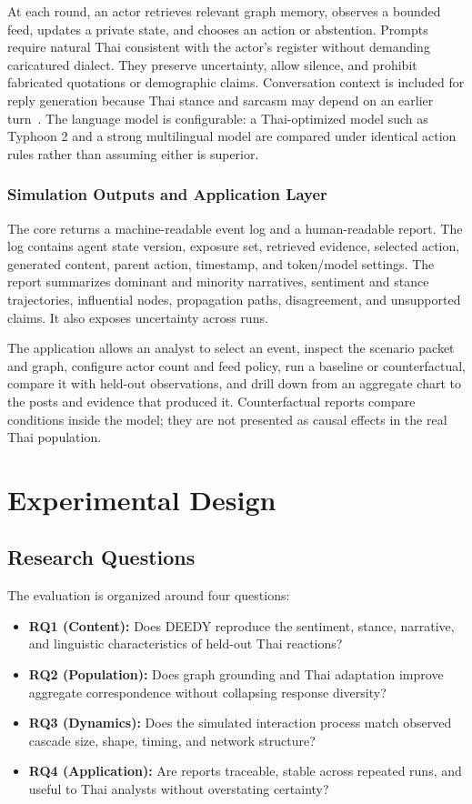 \documentclass[conference]{IEEEtran}
\begin{document}
At each round, an actor retrieves relevant graph memory, observes a bounded
feed, updates a private state, and chooses an action or abstention. Prompts
require natural Thai consistent with the actor's register without demanding
caricatured dialect. They preserve uncertainty, allow silence, and prohibit
fabricated quotations or demographic claims. Conversation context is included
for reply generation because Thai stance and sarcasm may depend on an earlier
turn~\cite{hazarika2018cascade}. The language model is configurable: a
Thai-optimized model such as Typhoon 2 and a strong multilingual model are
compared under identical action rules rather than assuming either is superior.

\subsubsection{Simulation Outputs and Application Layer}

The core returns a machine-readable event log and a human-readable report. The
log contains agent state version, exposure set, retrieved evidence, selected
action, generated content, parent action, timestamp, and token/model settings.
The report summarizes dominant and minority narratives, sentiment and stance
trajectories, influential nodes, propagation paths, disagreement, and
unsupported claims. It also exposes uncertainty across runs.

The application allows an analyst to select an event, inspect the scenario
packet and graph, configure actor count and feed policy, run a baseline or
counterfactual, compare it with held-out observations, and drill down from an
aggregate chart to the posts and evidence that produced it. Counterfactual
reports compare conditions inside the model; they are not presented as causal
effects in the real Thai population.

\section{Experimental Design}

\subsection{Research Questions}

The evaluation is organized around four questions:
\begin{itemize}
    \item \textbf{RQ1 (Content):} Does DEEDY reproduce the sentiment, stance,
    narrative, and linguistic characteristics of held-out Thai reactions?
    \item \textbf{RQ2 (Population):} Does graph grounding and Thai adaptation
    improve aggregate correspondence without collapsing response diversity?
    \item \textbf{RQ3 (Dynamics):} Does the simulated interaction process match
    observed cascade size, shape, timing, and network structure?
    \item \textbf{RQ4 (Application):} Are reports traceable, stable across
    repeated runs, and useful to Thai analysts without overstating certainty?
\end{itemize}
\end{document}
